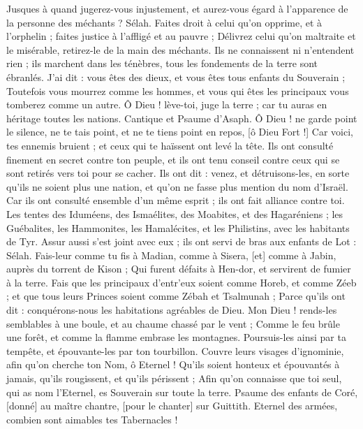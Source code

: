 \begin{multicols}{2}
Jusques à quand jugerez-vous injustement, et aurez-vous égard à l'apparence de la personne des méchants ? Sélah.
Faites droit à celui qu'on opprime, et à l'orphelin ; faites justice à l'affligé et au pauvre ;
Délivrez celui qu'on maltraite et le misérable, retirez-le de la main des méchants.
Ils ne connaissent ni n'entendent rien ; ils marchent dans les ténèbres, tous les fondements de la terre sont ébranlés.
J'ai dit : vous êtes des dieux, et vous êtes tous enfants du Souverain ;
Toutefois vous mourrez comme les hommes, et vous qui êtes les principaux vous tomberez comme un autre.
Ô Dieu ! lève-toi, juge la terre ; car tu auras en héritage toutes les nations.
\VerseOne{}Cantique et Psaume d'Asaph. Ô Dieu ! ne garde point le silence, ne te tais point, et ne te tiens point en repos, [ô Dieu Fort !]
Car voici, tes ennemis bruient ; et ceux qui te haïssent ont levé la tête.
Ils ont consulté finement en secret contre ton peuple, et ils ont tenu conseil contre ceux qui se sont retirés vers toi pour se cacher.
Ils ont dit : venez, et détruisons-les, en sorte qu'ils ne soient plus une nation, et qu'on ne fasse plus mention du nom d'Israël.
Car ils ont consulté ensemble d'un même esprit ; ils ont fait alliance contre toi.
Les tentes des Iduméens, des Ismaélites, des Moabites, et des Hagaréniens ;
les Guébalites, les Hammonites, les Hamalécites, et les Philistins, avec les habitants de Tyr.
Assur aussi s'est joint avec eux ; ils ont servi de bras aux enfants de Lot : Sélah.
Fais-leur comme tu fis à Madian, comme à Sisera, [et] comme à Jabin, auprès du torrent de Kison ;
Qui furent défaits à Hen-dor, et servirent de fumier à la terre.
Fais que les principaux d'entr'eux soient comme Horeb, et comme Zéeb ; et que tous leurs Princes soient comme Zébah et Tsalmunah ;
Parce qu'ils ont dit : conquérons-nous les habitations agréables de Dieu.
Mon Dieu ! rends-les semblables à une boule, et au chaume chassé par le vent ;
Comme le feu brûle une forêt, et comme la flamme embrase les montagnes.
Poursuis-les ainsi par ta tempête, et épouvante-les par ton tourbillon.
Couvre leurs visages d'ignominie, afin qu'on cherche ton Nom, ô Eternel !
Qu'ils soient honteux et épouvantés à jamais, qu'ils rougissent, et qu'ils périssent ;
Afin qu'on connaisse que toi seul, qui as nom l’Eternel, es Souverain sur toute la terre.
\VerseOne{}Psaume des enfants de Coré, [donné] au maître chantre, [pour le chanter] sur Guittith. Eternel des armées, combien sont aimables tes Tabernacles !

\end{multicols}
